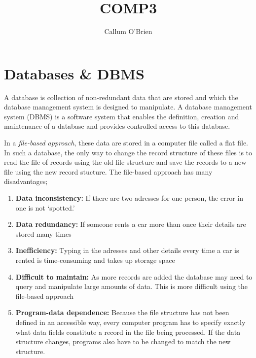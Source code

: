 \documentclass{article}
\title{COMP3}
\author{Callum O'Brien}
\begin{document}
\maketitle
\tableofcontents

\newpage

\section{Databases \& DBMS}

A database is collection of non-redundant data that are stored and which the database management system is designed to manipulate. A database management system (DBMS) is a software system that enables the definition, creation and maintenance of a database and provides controlled access to this database.

In a \textit{file-based approach}, these data are stored in a computer file called a flat file. In such a database, the only way to change the record structure of these files is to read the file of records using the old file structure and save the records to a new file using the new record stucture. The file-based approach has many disadvantages;\begin{enumerate}
    \item \textbf{Data inconsistency:} If there are two adresses for one person, the error in one is not `spotted.'
    \item \textbf{Data redundancy:} If someone rents a car more than once their details are stored many times
    \item \textbf{Inefficiency:} Typing in the adresses and other details every time a car is rented is time-consuming and takes up storage space
    \item \textbf{Difficult to maintain:} As more records are added the database may need to query and manipulate large amounts of data. This is more difficult using the file-based approach
    \item \textbf{Program-data dependence:} Because the file structure has not been defined in an accessible way, every computer program has to specify exactly what data fields constitute a record in the file being processed. If the data structure changes, programs also have to be changed to match the new structure.
\end{enumerate}
\end{document}
